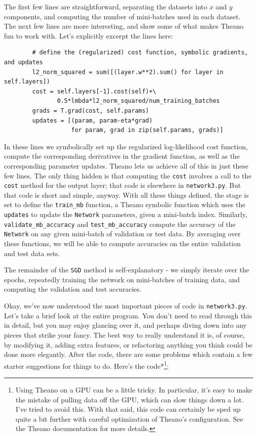 The first few lines are straightforward, separating the datasets into $x$ and $y$ components, and computing the number of mini-batches used in each dataset. The next few lines are more interesting, and show some of what makes Theano fun to work with. Let's explicitly excerpt the lines here:



\begin{lstlisting}
        # define the (regularized) cost function, symbolic gradients, and updates
        l2_norm_squared = sum([(layer.w**2).sum() for layer in self.layers])
        cost = self.layers[-1].cost(self)+\
               0.5*lmbda*l2_norm_squared/num_training_batches
        grads = T.grad(cost, self.params)
        updates = [(param, param-eta*grad) 
                   for param, grad in zip(self.params, grads)]

\end{lstlisting}


In these lines we symbolically set up the regularized log-likelihood cost function, compute the corresponding derivatives in the gradient function, as well as the corresponding parameter updates. Theano lets us achieve all of this in just these few lines. The only thing hidden is that computing the \texttt{cost} involves a call to the \texttt{cost} method for the output layer; that code is elsewhere in \texttt{network3.py}. But that code is short and simple, anyway. With all these things defined, the stage is set to define the \texttt{train\_\allowbreak{}mb} function, a Theano symbolic function which uses the \texttt{updates} to update the \texttt{Network} parameters, given a mini-batch index. Similarly, \texttt{validate\_\allowbreak{}mb\_\allowbreak{}accuracy} and \texttt{test\_\allowbreak{}mb\_\allowbreak{}accuracy} compute the accuracy of the \texttt{Network} on any given mini-batch of validation or test data. By averaging over these functions, we will be able to compute accuracies on the entire validation and test data sets.


The remainder of the \texttt{SGD} method is self-explanatory - we simply iterate over the epochs, repeatedly training the network on mini-batches of training data, and computing the validation and test accuracies.


Okay, we've now understood the most important pieces of code in \texttt{network3.py}. Let's take a brief look at the entire program. You don't need to read through this in detail, but you may enjoy glancing over it, and perhaps diving down into any pieces that strike your fancy. The best way to really understand it is, of course, by modifying it, adding extra features, or refactoring anything you think could be done more elegantly. After the code, there are some problems which contain a few starter suggestions for things to do. Here's the code*\footnote{Using Theano on a GPU can be a little tricky. In particular, it's easy to make the mistake of pulling data off the GPU, which can slow things down a lot. I've tried to avoid this. With that said, this code can certainly be sped up quite a bit further with careful optimization of Theano's configuration. See the Theano documentation for more details.}:



